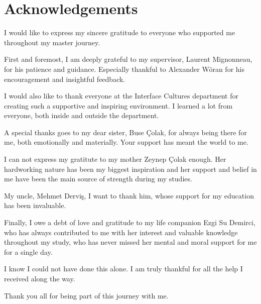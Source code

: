 \section*{Acknowledgements}
    I would like to express my sincere gratitude to everyone who supported me throughout my master journey.\par

    First and foremost, I am deeply grateful to my supervisor, Laurent Mignonneau, for his patience and guidance. Especially thankful to Alexander Wöran for his encouragement and insightful feedback.\par

    I would also like to thank everyone at the Interface Cultures department for creating such a supportive and inspiring environment. I learned a lot from everyone, both inside and outside the department.\par

    A special thanks goes to my dear sister, Buse Çolak, for always being there for me, both emotionally and materially. Your support has meant the world to me.\par

    I can not express my gratitute to my mother Zeynep Çolak enough. Her hardworking nature has been my biggest inspiration and her support and belief in me have been the main source of strength during my studies.\par

    My uncle, Mehmet Derviş, I want to thank him, whose support for my education has been invaluable.\par

    Finally, I owe a debt of love and gratitude to my life companion Ezgi Su Demirci, who has always contributed to me with her interest and valuable knowledge throughout my study, who has never missed her mental and moral support for me for a single day.\par

    I know I could not have done this alone. I am truly thankful for all the help I received along the way.\par

    Thank you all for being part of this journey with me.\par